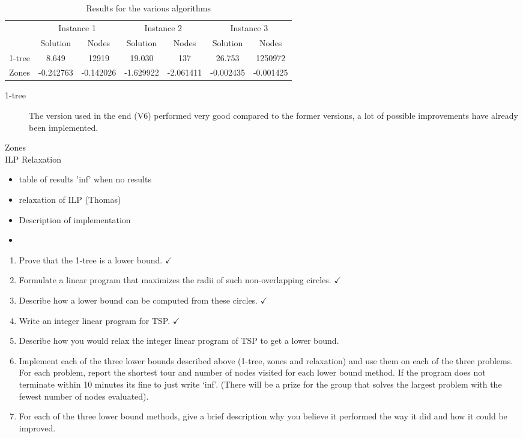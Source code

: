 \documentclass{article}
\begin{document}
\begin{table}[h!]
  \centering
  \begin{tabular}{l|c|c|c|c|c|c}
    & \multicolumn{2}{c|}{Instance 1} & \multicolumn{2}{|c|}{Instance 2} & \multicolumn{2}{|c}{Instance 3} \\
    & Solution & Nodes &  Solution & Nodes & Solution & Nodes \\
    \hline
    1-tree & 8.649 & 12919 &  19.030 & 137 & 26.753 & 1250972 \\ 
    Zones & -0.242763 & -0.142026 & -1.629922 & -2.061411 & -0.002435 & -0.001425 \\
  \end{tabular}
  \caption{Results for the various algorithms}
  \label{tab:results}
\end{table}

\begin{description}
\item[1-tree] The version used in the end (V6) performed very good compared to the former versions, a lot of possible improvements have already been implemented.
\item[Zones]
\item[ILP Relaxation]
\end{description}

\begin{itemize}
\item table of results 'inf' when no results
\item relaxation of ILP (Thomas)
\item Description of implementation
\item 
\end{itemize}



\newpage
\begin{enumerate}
  \item Prove that the 1-tree is a lower bound. $\checkmark$
  \item Formulate a linear program that maximizes the radii of such
    non-overlapping circles. $\checkmark$
  \item Describe how a lower bound can be computed from these circles. $\checkmark$
  \item Write an integer linear program for TSP. $\checkmark$
  \item Describe how you would relax the integer linear program of TSP to get a lower bound.
  \item Implement each of the three lower bounds described above (1-tree, zones and relaxation) and use them on each of the three problems. For each problem, report the shortest tour and number of nodes visited for each lower bound method. If the program does not terminate within 10 minutes its fine to just write ‘inf’. (There will be a prize for the group that solves the largest problem with the fewest number of nodes evaluated).
  \item For each of the three lower bound methods, give a brief description why you believe it performed the way it did and how it could be improved. 
\end{enumerate}
\end{document}
